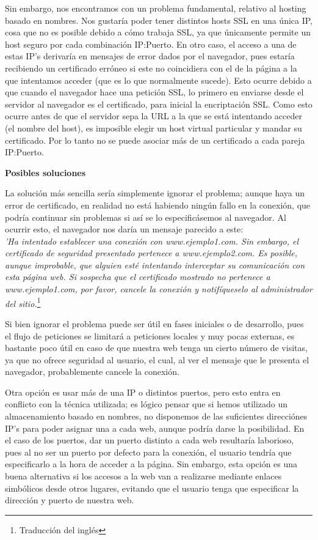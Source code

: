 \documentclass[a4paper, 10pt]{article} %
\begin{document}
Sin embargo, nos encontramos con un problema fundamental, relativo al hosting basado en nombres. Nos gustaría poder tener distintos hosts SSL en una única IP, cosa que no es posible debido a cómo trabaja SSL, ya que únicamente permite un host seguro por cada combinación IP:Puerto. En otro caso, el acceso a una de estas IP's derivaría en mensajes de error dados por el navegador, pues estaría recibiendo un certificado erróneo si este no coincidiera con el de la página a la que intentamos acceder (que es lo que normalmente sucede). Esto ocurre debido a que cuando el navegador hace una petición SSL, lo primero en enviarse desde el servidor al navegador es el certificado, para inicial la encriptación SSL. Como esto ocurre antes de que el servidor sepa la URL a la que se está intentando acceder (el nombre del host), es imposible elegir un host virtual particular y mandar su certificado. Por lo tanto no se puede asociar más de un certificado a cada pareja IP:Puerto. 

\textbf{Posibles soluciones}

La solución más sencilla sería simplemente ignorar el problema; aunque haya un error de certificado, en realidad no está habiendo ningún fallo en la conexión, que podría continuar sin problemas si así se lo especificásemos al navegador. Al ocurrir esto, el navegador nos daría un mensaje parecido a este: \\
\textit{'Ha intentado establecer una conexión con www.ejemplo1.com. Sin embargo, el certificado de seguridad presentado pertenece a www.ejemplo2.com. Es posible, aunque improbable, que alguien esté intentando interceptar su comunicación con esta página web. Si sospecha que el certificado mostrado no pertenece a www.ejemplo1.com, por favor, cancele la conexión y notifíqueselo al administrador del sitio.}\footnote{Traducción del inglés} 

Si bien ignorar el problema puede ser útil en fases iniciales o de desarrollo, pues el flujo de peticiones se limitará a peticiones locales y muy pocas externas, es bastante poco útil en caso de que nuestra web tenga un cierto número de visitas, ya que no ofrece seguridad al usuario, el cual, al ver el mensaje que le presenta el navegador, probablemente cancele la conexión. 

Otra opción es usar más de una IP o distintos puertos, pero esto entra en conflicto con la técnica utilizada; es lógico pensar que si hemos utilizado un almacenamiento basado en nombres, no disponemos de las suficientes direcciónes IP's para poder asignar una a cada web, aunque podría darse la posibilidad. En el caso de los puertos, dar un puerto distinto a cada web resultaría laborioso, pues al no ser un puerto por defecto para la conexión, el usuario tendría que especificarlo a la hora de acceder a la página. Sin embargo, esta opción es una buena alternativa si los accesos a la web van a realizarse mediante enlaces simbólicos desde otros lugares, evitando que el usuario tenga que especificar la dirección y puerto de nuestra web.
\end{document}
